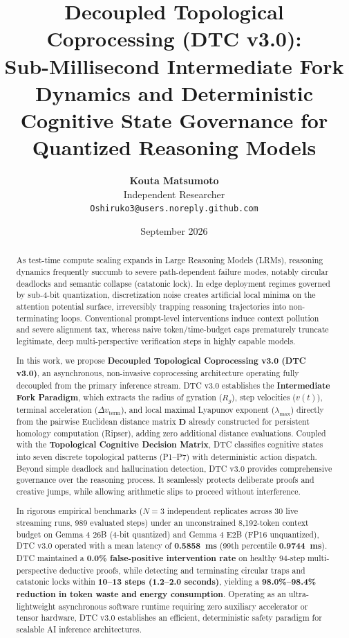 \documentclass[11pt,a4paper]{article}
\title{\textbf{\Large Decoupled Topological Coprocessing (DTC v3.0):\\Sub-Millisecond Intermediate Fork Dynamics and Deterministic Cognitive State Governance for Quantized Reasoning Models}}
\author{\textbf{Kouta Matsumoto}\\[0.2em]
\normalsize Independent Researcher\\
\normalsize \texttt{Oshiruko3@users.noreply.github.com}}
\date{September 2026}
\begin{document}
\maketitle

\begin{abstract}
\noindent As test-time compute scaling expands in Large Reasoning Models (LRMs), reasoning dynamics frequently succumb to severe path-dependent failure modes, notably circular deadlocks and semantic collapse (catatonic lock). In edge deployment regimes governed by sub-4-bit quantization, discretization noise creates artificial local minima on the attention potential surface, irreversibly trapping reasoning trajectories into non-terminating loops. Conventional prompt-level interventions induce context pollution and severe alignment tax, whereas naive token/time-budget caps prematurely truncate legitimate, deep multi-perspective verification steps in highly capable models.

In this work, we propose \textbf{Decoupled Topological Coprocessing v3.0 (DTC v3.0)}, an asynchronous, non-invasive coprocessing architecture operating fully decoupled from the primary inference stream. DTC v3.0 establishes the \textbf{Intermediate Fork Paradigm}, which extracts the radius of gyration ($R_g$), step velocities ($v(t)$), terminal acceleration ($\Delta v_{\mathrm{term}}$), and local maximal Lyapunov exponent ($\lambda_{\max}$) directly from the pairwise Euclidean distance matrix $\mathbf{D}$ already constructed for persistent homology computation (Ripser), adding zero additional distance evaluations. Coupled with the \textbf{Topological Cognitive Decision Matrix}, DTC classifies cognitive states into seven discrete topological patterns (P1--P7) with deterministic action dispatch. Beyond simple deadlock and hallucination detection, DTC v3.0 provides comprehensive governance over the reasoning process. It seamlessly protects deliberate proofs and creative jumps, while allowing arithmetic slips to proceed without interference.

In rigorous empirical benchmarks ($N=3$ independent replicates across 30 live streaming runs, 989 evaluated steps) under an unconstrained 8,192-token context budget on Gemma 4 26B (4-bit quantized) and Gemma 4 E2B (FP16 unquantized), DTC v3.0 operated with a mean latency of \textbf{0.5858~ms} (99th percentile \textbf{0.9744~ms}). DTC maintained a \textbf{0.0\% false-positive intervention rate} on healthy 94-step multi-perspective deductive proofs, while detecting and terminating circular traps and catatonic locks within \textbf{10--13 steps (1.2--2.0 seconds)}, yielding a \textbf{98.0\%--98.4\% reduction in token waste and energy consumption}. Operating as an ultra-lightweight asynchronous software runtime requiring zero auxiliary accelerator or tensor hardware, DTC v3.0 establishes an efficient, deterministic safety paradigm for scalable AI inference architectures.
\end{abstract}
\end{document}

